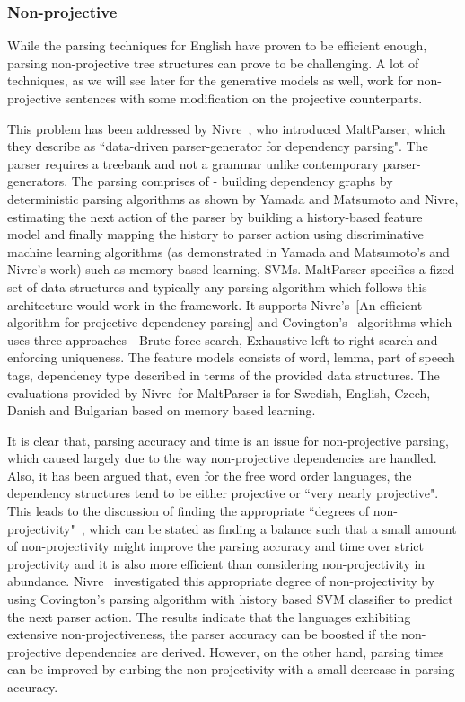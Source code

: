 \subsubsection{Non-projective}

While the parsing techniques for English have proven to be efficient enough, parsing non-projective tree structures can prove to be challenging. A lot of techniques, as we will see later for the generative models as well, work for non-projective sentences with some modification on the projective counterparts. 
          
This problem has been addressed by Nivre~\etal\cite{nivre2006maltparser,nivre2007maltparser}, who introduced MaltParser, which they describe as ``data-driven parser-generator for dependency parsing". The parser requires a treebank and not a grammar unlike contemporary parser-generators. The parsing comprises of - building dependency graphs by deterministic parsing algorithms as shown by Yamada and Matsumoto and Nivre, estimating the next action of the parser by building a history-based feature model and finally mapping the history to parser action using discriminative machine learning algorithms (as demonstrated in Yamada and Matsumoto's and Nivre's work) such as memory based learning, SVMs. MaltParser specifies a fized set of data structures and typically any parsing algorithm which follows this architecture would work in the framework. It supports Nivre's~\cite{nivre2003efficient}[An efficient algorithm for projective dependency parsing] and Covington's~\cite{covington2001fundamental} algorithms which uses three approaches - Brute-force search, Exhaustive left-to-right search and enforcing uniqueness. The feature models consists of word, lemma, part of speech tags, dependency type described in terms of the provided data structures. The evaluations provided by Nivre~\etal for MaltParser is for Swedish, English, Czech, Danish and Bulgarian based on memory based learning.

It is clear that, parsing accuracy and time is an issue for non-projective parsing, which caused largely due to the way non-projective dependencies are handled. Also, it has been argued that, even for the free word order languages, the dependency structures tend to be either projective or ``very nearly projective". This leads to the discussion of finding the appropriate ``degrees of non-projectivity"~\cite{nivre2006constraints}, which can be stated as finding a balance such that a small amount of non-projectivity might improve the parsing accuracy and time over strict projectivity and it is also more efficient than considering non-projectivity in abundance. Nivre~\cite{nivre2007incremental} investigated this appropriate degree of non-projectivity by using Covington's parsing algorithm with history based SVM classifier to  predict the next parser action. The results indicate that the languages exhibiting extensive non-projectiveness, the parser accuracy can be boosted if the non-projective dependencies are derived. However, on the other hand, parsing times can be improved by curbing the non-projectivity with a small decrease in parsing accuracy. 

